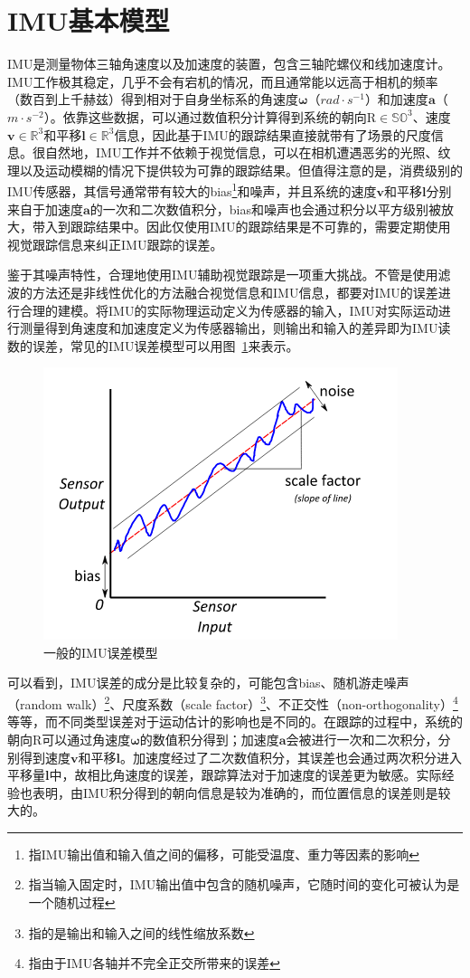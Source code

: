 \section{IMU基本模型}

IMU是测量物体三轴角速度以及加速度的装置，包含三轴陀螺仪和线加速度计。IMU工作极其稳定，几乎不会有宕机的情况，而且通常能以远高于相机的频率（数百到上千赫兹）得到相对于自身坐标系的角速度$\bm{\omega}$（$rad \cdot s^{-1}$）和加速度$\bm{a}$（$m \cdot s^{-2}$）。依靠这些数据，可以通过数值积分计算得到系统的朝向$\mathrm{R}\in\mathbb{SO}^3$、速度$\bm{v}\in\mathbb{R}^3$和平移$\bm{l}\in\mathbb{R}^3$信息，因此基于IMU的跟踪结果直接就带有了场景的尺度信息。很自然地，IMU工作并不依赖于视觉信息，可以在相机遭遇恶劣的光照、纹理以及运动模糊的情况下提供较为可靠的跟踪结果。但值得注意的是，消费级别的IMU传感器，其信号通常带有较大的bias\footnote{指IMU输出值和输入值之间的偏移，可能受温度、重力等因素的影响}和噪声，并且系统的速度$\bm{v}$和平移$\bm{l}$分别来自于加速度$\bm{a}$的一次和二次数值积分，bias和噪声也会通过积分以平方级别被放大，带入到跟踪结果中。因此仅使用IMU的跟踪结果是不可靠的，需要定期使用视觉跟踪信息来纠正IMU跟踪的误差。

鉴于其噪声特性，合理地使用IMU辅助视觉跟踪是一项重大挑战。不管是使用滤波的方法还是非线性优化的方法融合视觉信息和IMU信息，都要对IMU的误差进行合理的建模。将IMU的实际物理运动定义为传感器的输入，IMU对实际运动进行测量得到角速度和加速度定义为传感器输出，则输出和输入的差异即为IMU读数的误差，常见的IMU误差模型可以用图~\ref{fig:common_imu_errors}来表示。

\begin{figure}[htb!]
    \centering
    \includegraphics[width=.4\textwidth]{Pictures/common_imu_errors.png}
    \caption{一般的IMU误差模型\citep{imu2014}}
    \label{fig:common_imu_errors}
\end{figure}

可以看到，IMU误差的成分是比较复杂的，可能包含bias、随机游走噪声（random walk）\footnote{指当输入固定时，IMU输出值中包含的随机噪声，它随时间的变化可被认为是一个随机过程}、尺度系数（scale factor）\footnote{指的是输出和输入之间的线性缩放系数}、不正交性（non-orthogonality）\footnote{指由于IMU各轴并不完全正交所带来的误差}等等\citep{imu2014}，而不同类型误差对于运动估计的影响也是不同的。在跟踪的过程中，系统的朝向$\mathrm{R}$可以通过角速度$\bm{\omega}$的数值积分得到；加速度$\bm{a}$会被进行一次和二次积分，分别得到速度$\bm{v}$和平移$\bm{l}$。加速度经过了二次数值积分，其误差也会通过两次积分进入平移量$\bm{l}$中，故相比角速度的误差，跟踪算法对于加速度的误差更为敏感。实际经验也表明，由IMU积分得到的朝向信息是较为准确的，而位置信息的误差则是较大的。

